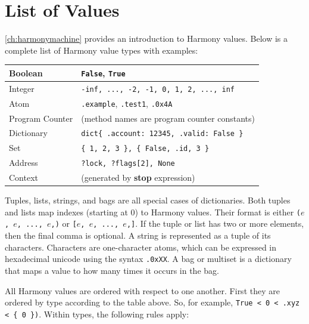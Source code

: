 \documentclass{report}
\begin{document}



\appendix

\chapter{List of Values}
\label{ap:values}

\autoref{ch:harmonymachine} provides an introduction to Harmony values.
Below is a complete list of Harmony value types with examples:

\vspace{1em}
\begin{tabular}{|l|l|}
\hline
Boolean & \texttt{False}, \texttt{True} \\
\hline
Integer & \texttt{-inf, ..., -2, -1, 0, 1, 2, ..., inf} \\
\hline
Atom & \texttt{.example}, \texttt{.test1}, \texttt{.0x4A} \\
\hline
Program Counter & (method names are program counter constants) \\
\hline
Dictionary & \texttt{dict\{ .account: 12345, .valid: False \} } \\
\hline
Set & \texttt{\{ 1, 2, 3 \}, \{ False, .id, 3 \} } \\
\hline
Address & \texttt{?lock, ?flags[2], None} \\
\hline
Context & (generated by \textbf{stop} expression) \\
\hline
\end{tabular}
\vspace{1em}

Tuples, lists, strings, and bags are all special cases of dictionaries.
Both tuples and lists map indexes (starting at 0) to Harmony values.
Their format is either \texttt{($e$, $e$, ..., $e$,)} or
\texttt{[$e$, $e$, ..., $e$,]}.
If the tuple or list has two or more elements, then the final comma
is optional.
A string is represented as a tuple of its characters.
Characters are one-character atoms, which can be expressed
in hexadecimal unicode using the syntax \texttt{.0xXX}.
A bag or multiset is a dictionary that maps a value to how many
times it occurs in the bag.

All Harmony values are ordered with respect to one another.  First they
are ordered by type according to the table above.
So, for example, \texttt{\texttt{True} < 0 < .xyz < \{ 0 \})}.
Within types, the following rules apply:
\end{document}
